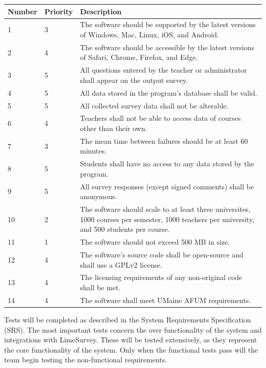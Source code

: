 \documentclass{article}
\begin{document}
\begin{center}
\begin{tabular}{|p{1.5cm}|p{1.5cm}|p{8cm}|}
\hline
\textbf{Number} & \textbf{Priority} & \textbf{Description} \\
\hline
1 & 3 & The software should be supported by the latest versions of Windows, Mac, Linux, iOS, and Android.\\ 
\hline
2 & 4 & The software should be accessible by the latest versions of Safari, Chrome, Firefox, and Edge.\\ 
\hline
3 & 5 & All questions entered by the teacher or administrator shall appear on the output survey.\\  
\hline
4 & 5 & All data stored in the program's database shall be valid.\\
\hline
5 & 5 & All collected survey data shall not be alterable.\\ 
\hline
6 & 4 & Teachers shall not be able to access data of courses other than their own.\\ 
\hline
7 & 3 & The mean time between failures should be at least 60 minutes.\\ 
\hline
8 & 5 & Students shall have no access to any data stored by the program.\\ 
\hline
9 & 5 & All survey responses (except signed \newline comments) shall be anonymous.\\ 
\hline
10 & 2 & The software should scale to at least three universites, 1000 courses per semester, 1000 teachers per university, and 500 students per course.\\  
\hline
11 & 1 & The software should not exceed 500 MB in size.\\
\hline
12 & 4 & The software's source code shall be open-source and shall use a GPLv2 license.\\ 
\hline
13 & 4 & The licensing requirements of any non-original code shall be met.\\ 
\hline
14 & 4 & The software shall meet UMaine AFUM requirements.\\ 
\hline
\end{tabular}
\end{center}

Tests will be completed as described in the System Requirements Specification (SRS). The most important tests concern the over functionality of the system and integrations with LimeSurvey. These will be tested extensively, as they represent the core functionality of the system. Only when the functional tests pass will the team begin testing the non-functional requirements. 
\end{document}
